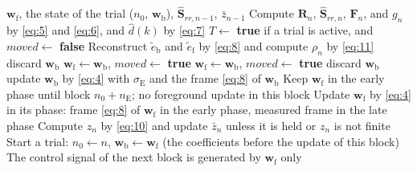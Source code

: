 \begin{algorithm}[tbp]
\caption{Processing of the proposed algorithm in block $n$}
\label{alg:block}
\begin{algorithmic}[1]
\Require $\mathbf{w}_{\mathrm f}$, the state of the trial ($n_0$, $\mathbf{w}_{\mathrm b}$), $\hat{\mathbf{S}}_{rr,n-1}$, $\bar{z}_{n-1}$
\State Compute $\mathbf{R}_n$, $\hat{\mathbf{S}}_{rr,n}$, $\mathbf{F}_n$, and $g_n$ by \eqref{eq:5} and \eqref{eq:6}, and $\hat{d}(k)$ by \eqref{eq:7}
\State $T \gets$ \textbf{true} if a trial is active, and $\mathit{moved} \gets$ \textbf{false}
 
    \State Reconstruct $\tilde{e}_{\mathrm b}$ and $\tilde{e}_{\mathrm f}$ by \eqref{eq:8} and compute $\rho_n$ by \eqref{eq:11}
     discard $\mathbf{w}_{\mathrm b}$
     $\mathbf{w}_{\mathrm f} \gets \mathbf{w}_{\mathrm b}$, $\mathit{moved} \gets$ \textbf{true}
     $\mathbf{w}_{\mathrm f} \gets \mathbf{w}_{\mathrm b}$, $\mathit{moved} \gets$ \textbf{true}
     discard $\mathbf{w}_{\mathrm b}$
    \EndIf
  \EndIf
   update $\mathbf{w}_{\mathrm b}$ by \eqref{eq:4} with $\sigma_{\mathrm E}$ and the frame \eqref{eq:8} of $\mathbf{w}_{\mathrm b}$
  \EndIf
\EndIf
{}
  \State Keep $\mathbf{w}_{\mathrm f}$ in the early phase until block $n_0 + n_{\mathrm E}$; no foreground update in this block
\Else
  \State Update $\mathbf{w}_{\mathrm f}$ by \eqref{eq:4} in its phase: frame \eqref{eq:8} of $\mathbf{w}_{\mathrm f}$ in the early phase, measured frame in the late phase
\EndIf
\State Compute $z_n$ by \eqref{eq:10} and update $\bar{z}_n$ unless it is held or $z_n$ is not finite
  \State Start a trial: $n_0 \gets n$, $\mathbf{w}_{\mathrm b} \gets \mathbf{w}_{\mathrm f}$ (the coefficients before the update of this block)
\EndIf
\State The control signal of the next block is generated by $\mathbf{w}_{\mathrm f}$ only
\end{algorithmic}
\end{algorithm}
